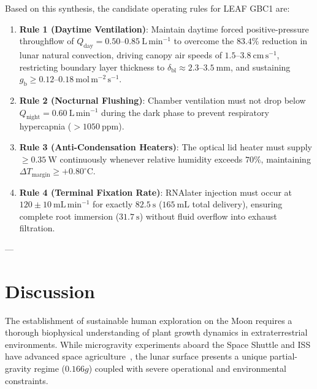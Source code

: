 \documentclass[pdflatex,sn-nature,iicol]{sn-jnl}
\begin{document}
Based on this synthesis, the candidate operating rules for LEAF GBC1 are:
\begin{enumerate}
    \item \textbf{Rule 1 (Daytime Ventilation)}: Maintain daytime forced positive-pressure throughflow of $Q_{\mathrm{day}} = 0.50\text{--}0.85\ \mathrm{L\,min^{-1}}$ to overcome the $83.4\%$ reduction in lunar natural convection, driving canopy air speeds of $1.5\text{--}3.8\ \mathrm{cm\,s^{-1}}$, restricting boundary layer thickness to $\delta_{\mathrm{bl}} \approx 2.3\text{--}3.5\ \mathrm{mm}$, and sustaining $g_{\mathrm{b}} \ge 0.12\text{--}0.18\ \mathrm{mol\,m^{-2}\,s^{-1}}$.
    \item \textbf{Rule 2 (Nocturnal Flushing)}: Chamber ventilation must not drop below $Q_{\mathrm{night}} = 0.60\ \mathrm{L\,min^{-1}}$ during the dark phase to prevent respiratory  hypercapnia ($>1050\ \mathrm{ppm}$).
    \item \textbf{Rule 3 (Anti-Condensation Heaters)}: The optical lid heater must supply $\ge 0.35\ \mathrm{W}$ continuously whenever relative humidity exceeds $70\%$, maintaining $\Delta T_{\mathrm{margin}} \ge +0.80^\circ\mathrm{C}$.
    \item \textbf{Rule 4 (Terminal Fixation Rate)}: RNAlater injection must occur at $120 \pm 10\ \mathrm{mL\,min^{-1}}$ for exactly $82.5\ \mathrm{s}$ ($165\ \mathrm{mL}$ total delivery), ensuring complete root immersion ($31.7\ \mathrm{s}$) without fluid overflow into exhaust filtration.
\end{enumerate}

---

\section{Discussion}\label{sec:discussion}

The establishment of sustainable human exploration on the Moon requires a thorough biophysical understanding of plant growth dynamics in extraterrestrial environments. While microgravity experiments aboard the Space Shuttle and ISS have advanced space agriculture~\cite{paul2013fundamental,massa2016plant,monje2020hardware}, the lunar surface presents a unique partial-gravity regime ($0.166g$) coupled with severe operational and environmental constraints.
\end{document}
